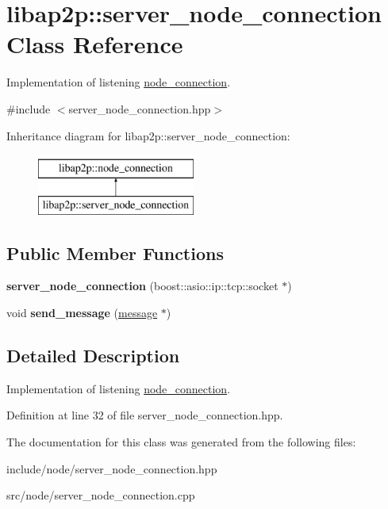 \hypertarget{classlibap2p_1_1server__node__connection}{\section{libap2p\-:\-:server\-\_\-node\-\_\-connection Class Reference}
\label{classlibap2p_1_1server__node__connection}
}


Implementation of listening \hyperlink{classlibap2p_1_1node__connection}{node\-\_\-connection}.  




{\ttfamily \#include $<$server\-\_\-node\-\_\-connection.\-hpp$>$}

Inheritance diagram for libap2p\-:\-:server\-\_\-node\-\_\-connection\-:\begin{figure}[H]
\begin{center}
\leavevmode
\includegraphics[height=2.000000cm]{classlibap2p_1_1server__node__connection}
\end{center}
\end{figure}
\subsection*{Public Member Functions}
\begin{DoxyCompactItemize}
\item 
\hypertarget{classlibap2p_1_1server__node__connection_afa04a0f8b0b18963484afd4f2521aa19}{{\bfseries server\-\_\-node\-\_\-connection} (boost\-::asio\-::ip\-::tcp\-::socket $\ast$)}\label{classlibap2p_1_1server__node__connection_afa04a0f8b0b18963484afd4f2521aa19}

\item 
\hypertarget{classlibap2p_1_1server__node__connection_a1ae5b6fee72cab29a6adc1e247fbb6c0}{void {\bfseries send\-\_\-message} (\hyperlink{classlibap2p_1_1message}{message} $\ast$)}\label{classlibap2p_1_1server__node__connection_a1ae5b6fee72cab29a6adc1e247fbb6c0}

\end{DoxyCompactItemize}


\subsection{Detailed Description}
Implementation of listening \hyperlink{classlibap2p_1_1node__connection}{node\-\_\-connection}. 

Definition at line 32 of file server\-\_\-node\-\_\-connection.\-hpp.



The documentation for this class was generated from the following files\-:\begin{DoxyCompactItemize}
\item 
include/node/server\-\_\-node\-\_\-connection.\-hpp\item 
src/node/server\-\_\-node\-\_\-connection.\-cpp\end{DoxyCompactItemize}
